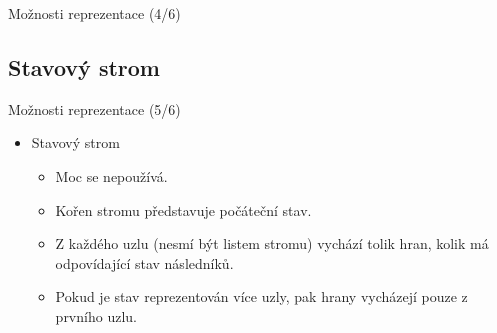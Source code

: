 \documentclass[hyperref={unicode}]{beamer}
\begin{document}
\begin{frame}{Možnosti reprezentace (4/6)}
\begin{center}
\end{center}
\end{frame}

\subsection{Stavový strom}
\begin{frame}[t]{Možnosti reprezentace (5/6)}
\begin{itemize}
    \item Stavový strom\vspace{1em}
    \begin{itemize}
        \setlength\itemsep{0.7em}
        \item Moc se nepoužívá.
        \item Kořen stromu představuje počáteční stav.
        \item Z každého uzlu (nesmí být listem stromu) vychází tolik hran, kolik má odpovídající stav následníků.
        \item Pokud je stav reprezentován více uzly, pak hrany vycházejí pouze z prvního uzlu.
    \end{itemize}
\end{itemize}
\end{frame}
\end{document}
